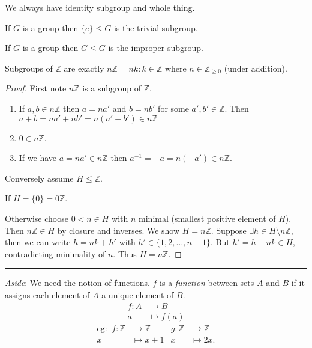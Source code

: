 We always have identity subgroup and whole thing.

\begin{example}
If \(G\) is a group then \(\{ e \} \leq G\) is the trivial subgroup.
\end{example}

\begin{example}
If \(G\) is a group then \(G \leq G\) is the improper subgroup.
\end{example}

\begin{proposition}
\protect\hypertarget{prp:nZ}{}\label{prp:nZ}Subgroups of \(\mathbb{Z}\) are exactly \(n \mathbb{Z} = {nk : k \in \mathbb{Z}}\) where \(n \in \mathbb{Z}_{\geq 0}\) (under addition).
\end{proposition}

\begin{proof}
First note \(n \mathbb{Z}\) is a subgroup of \(\mathbb{Z}\).

\begin{enumerate}
\def\labelenumi{\alph{enumi}.}
\item
  If \(a, b \in n \mathbb{Z}\) then \(a = na'\) and \(b = nb'\) for some \(a', b' \in \mathbb{Z}\).
  Then \(a + b = na' + nb' = n (a' + b') \in n \mathbb{Z}\)
\item
  \(0 \in n \mathbb{Z}\).
\item
  If we have \(a = na' \in n \mathbb{Z}\) then \(a^{-1} = -a = n(-a') \in n \mathbb{Z}\).
\end{enumerate}

Conversely assume \(H \leq \mathbb{Z}\).

If \(H = \{ 0 \} = 0 \mathbb{Z}\).

Otherwise choose \(0 < n \in H\) with \(n\) minimal (smallest positive element of \(H\)).
Then \(n \mathbb{Z} \in H\) by closure and inverses. We show \(H = n \mathbb{Z}\). Suppose \(\exists h \in H \setminus n \mathbb{Z}\), then we can write \(h = nk + h'\) with \(h' \in \{ 1, 2, \ldots, n -1 \}\). But \(h' = h - nk \in H\), contradicting minimality of \(n\). Thus \(H = n \mathbb{Z}\).
\end{proof}

\begin{center}\rule{0.5\linewidth}{0.5pt}\end{center}

\emph{Aside}: We need the notion of functions.
\(f\) is a \emph{function} between sets \(A\) and \(B\) if it assigns each element of \(A\) a unique element of \(B\).
\begin{align*}
    f: A &\to B \\
    a &\mapsto f(a)
\end{align*}
\begin{align*}
    \text{eg: }\ f: \mathbb{Z} &\to \mathbb{Z} & g: \mathbb{Z} &\to \mathbb{Z} \\
    x &\mapsto x + 1 & x &\mapsto 2x.
\end{align*}

